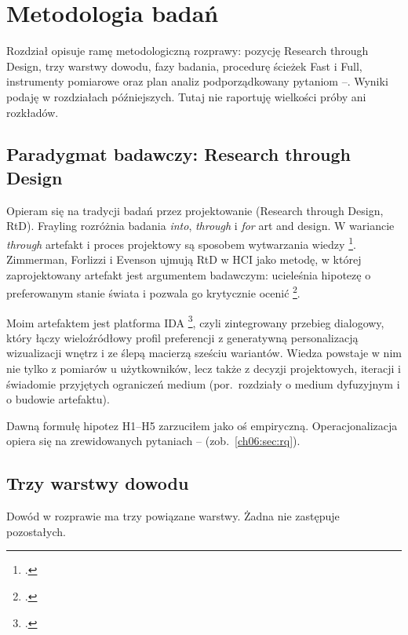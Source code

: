 \chapter{Metodologia badań}
\label{ch06:top}

Rozdział opisuje ramę metodologiczną rozprawy: pozycję Research through Design, trzy warstwy dowodu, fazy badania, procedurę ścieżek Fast i Full, instrumenty pomiarowe oraz plan analiz podporządkowany pytaniom --. Wyniki podaję w rozdziałach późniejszych. Tutaj nie raportuję wielkości próby ani rozkładów.

\section{Paradygmat badawczy: Research through Design}
\label{ch06:sec:paradygmat}

Opieram się na tradycji badań przez projektowanie (Research through Design, RtD). Frayling rozróżnia badania \emph{into}, \emph{through} i \emph{for} art and design. W wariancie \emph{through} artefakt i proces projektowy są sposobem wytwarzania wiedzy \footcite{frayling1993research}. Zimmerman, Forlizzi i Evenson ujmują RtD w HCI jako metodę, w której zaprojektowany artefakt jest argumentem badawczym: ucieleśnia hipotezę o preferowanym stanie świata i pozwala go krytycznie ocenić \footcite{zimmerman2007rtd}.

Moim artefaktem jest platforma IDA \footcite{idaPlatform2026}, czyli zintegrowany przebieg dialogowy, który łączy wieloźródłowy profil preferencji z generatywną personalizacją wizualizacji wnętrz i ze ślepą macierzą sześciu wariantów. Wiedza powstaje w nim nie tylko z pomiarów u użytkowników, lecz także z decyzji projektowych, iteracji i świadomie przyjętych ograniczeń medium (por.\ rozdziały o medium dyfuzyjnym i o budowie artefaktu).

Dawną formułę hipotez H1--H5 zarzuciłem jako oś empiryczną. Operacjonalizacja opiera się na zrewidowanych pytaniach -- (zob.\ \cref{ch06:sec:rq}).

\section{Trzy warstwy dowodu}
\label{ch06:sec:warstwy}

Dowód w rozprawie ma trzy powiązane warstwy. Żadna nie zastępuje pozostałych.

